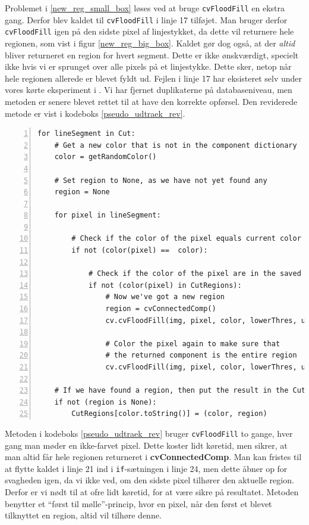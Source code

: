{Problemet i \ref{new_reg_small_box} løses ved at bruge
\texttt{cvFloodFill} en ekstra gang. Derfor blev kaldet til
\texttt{cvFloodFill} i linje 17 tilføjet. Man bruger derfor
\texttt{cvFloodFill} igen på den sidste pixel af linjestykket, da dette
vil returnere hele regionen, som vist i
figur \ref{new_reg_big_box}. Kaldet gør dog også, at der \emph{altid}
bliver returneret en region for hvert segment. Dette er ikke
ønskværdigt, specielt ikke hvis vi er sprunget over alle pixels på et
linjestykke. Dette sker, netop når hele regionen allerede er blevet fyldt
ud. Fejlen i linje 17 har eksisteret selv under vores kørte eksperiment
i .
Vi har fjernet duplikaterne på databaseniveau, men metoden er senere
blevet rettet til at have den korrekte opførsel. Den reviderede metode
er vist i kodeboks \ref{pseudo_udtraek_rev}.

\begin{lstlisting}[caption={Revideret pseudokode til udtrækning af
    regioner. Returnerer ingen
    duplikater.},captionpos=b,label={pseudo_udtraek_rev},numbers=left,
    frame=single, breaklines=false, float=p]
for lineSegment in Cut:
    # Get a new color that is not in the component dictionary
    color = getRandomColor()

    # Set region to None, as we have not yet found any
    region = None

    for pixel in lineSegment:

        # Check if the color of the pixel equals current color
        if not (color(pixel) ==  color):

            # Check if the color of the pixel are in the saved regions
            if not (color(pixel) in CutRegions):
                # Now we've got a new region
                region = cvConnectedComp()
                cv.cvFloodFill(img, pixel, color, lowerThres, upperThres, region)

                # Color the pixel again to make sure that
                # the returned component is the entire region
                cv.cvFloodFill(img, pixel, color, lowerThres, upperThres, region)

    # If we have found a region, then put the result in the CutRegions-dictionary
    if not (region is None):
        CutRegions[color.toString()] = (color, region)
\end{lstlisting}

Metoden i kodeboks \ref{pseudo_udtraek_rev} bruger \texttt{cvFloodFill}
to gange, hver gang man møder en ikke-farvet pixel. Dette koster lidt
køretid, men sikrer, at man altid får hele regionen returneret i
\textbf{cvConnectedComp}. Man kan fristes til at flytte kaldet i linje
21 ind i \texttt{if}-sætningen i linje 24, men dette åbner op for
svagheden igen, da vi ikke ved, om den sidste pixel tilhører den
aktuelle region. Derfor er vi nødt til at ofre lidt køretid, for at
være sikre på resultatet. Metoden benytter et ``først til
mølle''-princip, hvor en pixel, når den først et blevet tilknyttet en
region, altid vil tilhøre denne.

}
